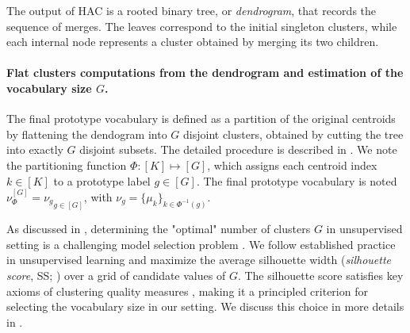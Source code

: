         The output of HAC is a rooted binary tree, or \emph{dendrogram}, that records the sequence of merges. The leaves correspond to the initial singleton clusters, while each internal node represents a cluster obtained by merging its two children.
        
        \paragraph{Flat clusters computations from the dendrogram and estimation of the vocabulary size \(G\).\\}

            The final prototype vocabulary is defined as a partition of the original centroids by flattening the dendogram into $G$ disjoint clusters, obtained by cutting the tree into exactly $G$ disjoint subsets. The detailed procedure is described in . We note the partitioning function $\Phi : [K] \mapsto [G]$, which assigns each centroid index $k \in [K]$ to a prototype label $g \in [G]$. The final prototype vocabulary is noted $\nu^{[G]}_\Phi = {\nu_g}_{g \in [G]}$, with $\nu_g = \{\mu_k\}_{k \in \Phi^{-1}(g)}$.
            
            As discussed in , determining the "optimal" number of clusters $G$ in unsupervised setting is a challenging model selection problem \cite{stop_using_elbow}. We follow established practice in unsupervised learning \cite{deAPMarques2022, LENSSEN2024102290, Batool2021, Hennig2015} and maximize the average silhouette width (\emph{silhouette score}, SS; \cite{ROUSSEEUW198753}) over a grid of candidate values of $G$. The silhouette score satisfies key axioms of clustering quality measures \cite{NIPS2008_beed1360}, making it a principled criterion for selecting the vocabulary size in our setting. We discuss this choice in more details in .


